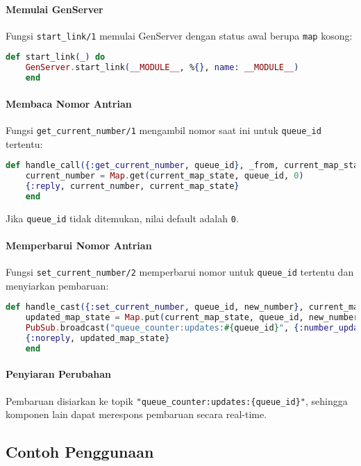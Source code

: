 \paragraph{Memulai GenServer}
Fungsi \texttt{start\_link/1} memulai GenServer dengan status awal berupa \texttt{map} kosong:
\begin{lstlisting}[language=Elixir]
	def start_link(_) do
	GenServer.start_link(__MODULE__, %{}, name: __MODULE__)
	end
\end{lstlisting}

\paragraph{Membaca Nomor Antrian}
Fungsi \texttt{get\_current\_number/1} mengambil nomor saat ini untuk \texttt{queue\_id} tertentu:
\begin{lstlisting}[language=Elixir]
	def handle_call({:get_current_number, queue_id}, _from, current_map_state) do
	current_number = Map.get(current_map_state, queue_id, 0)
	{:reply, current_number, current_map_state}
	end
\end{lstlisting}
Jika \texttt{queue\_id} tidak ditemukan, nilai default adalah \texttt{0}.

\paragraph{Memperbarui Nomor Antrian}
Fungsi \texttt{set\_current\_number/2} memperbarui nomor untuk \texttt{queue\_id} tertentu dan menyiarkan pembaruan:
\begin{lstlisting}[language=Elixir]
	def handle_cast({:set_current_number, queue_id, new_number}, current_map_state) do
	updated_map_state = Map.put(current_map_state, queue_id, new_number)
	PubSub.broadcast("queue_counter:updates:#{queue_id}", {:number_update, queue_id, new_number})
	{:noreply, updated_map_state}
	end
\end{lstlisting}

\paragraph{Penyiaran Perubahan}
Pembaruan disiarkan ke topik \texttt{"queue\_counter:updates:\{queue\_id\}"}, sehingga komponen lain dapat merespons pembaruan secara real-time.

\subsection{Contoh Penggunaan}

